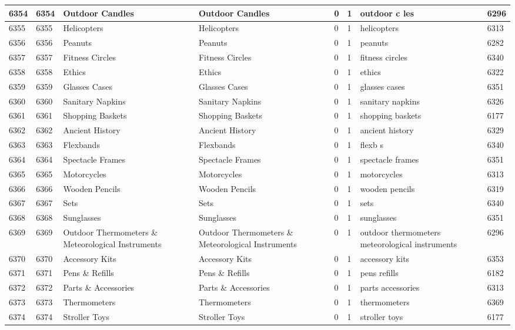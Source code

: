 \begin{longtable}{|l|l|l|l|l|l|l|l|}
6354 & 6354 & Outdoor Candles & Outdoor Candles & 0 & 1 & outdoor c les & 6296 \\ \hline 
6355 & 6355 & Helicopters & Helicopters & 0 & 1 & helicopters & 6313 \\ \hline 
6356 & 6356 & Peanuts & Peanuts & 0 & 1 & peanuts & 6282 \\ \hline 
6357 & 6357 & Fitness Circles & Fitness Circles & 0 & 1 & fitness circles & 6340 \\ \hline 
6358 & 6358 & Ethics & Ethics & 0 & 1 & ethics & 6322 \\ \hline 
6359 & 6359 & Glasses Cases & Glasses Cases & 0 & 1 & glasses cases & 6351 \\ \hline 
6360 & 6360 & Sanitary Napkins & Sanitary Napkins & 0 & 1 & sanitary napkins & 6326 \\ \hline 
6361 & 6361 & Shopping Baskets & Shopping Baskets & 0 & 1 & shopping baskets & 6177 \\ \hline 
6362 & 6362 & Ancient History & Ancient History & 0 & 1 & ancient history & 6329 \\ \hline 
6363 & 6363 & Flexbands & Flexbands & 0 & 1 & flexb s & 6340 \\ \hline 
6364 & 6364 & Spectacle Frames & Spectacle Frames & 0 & 1 & spectacle frames & 6351 \\ \hline 
6365 & 6365 & Motorcycles & Motorcycles & 0 & 1 & motorcycles & 6313 \\ \hline 
6366 & 6366 & Wooden Pencils & Wooden Pencils & 0 & 1 & wooden pencils & 6319 \\ \hline 
6367 & 6367 & Sets & Sets & 0 & 1 & sets & 6340 \\ \hline 
6368 & 6368 & Sunglasses & Sunglasses & 0 & 1 & sunglasses & 6351 \\ \hline 
6369 & 6369 & Outdoor Thermometers \& Meteorological Instruments & Outdoor Thermometers \& Meteorological Instruments & 0 & 1 & outdoor thermometers meteorological instruments & 6296 \\ \hline 
6370 & 6370 & Accessory Kits & Accessory Kits & 0 & 1 & accessory kits & 6353 \\ \hline 
6371 & 6371 & Pens \& Refills & Pens \& Refills & 0 & 1 & pens refills & 6182 \\ \hline 
6372 & 6372 & Parts \& Accessories & Parts \& Accessories & 0 & 1 & parts accessories & 6313 \\ \hline 
6373 & 6373 & Thermometers & Thermometers & 0 & 1 & thermometers & 6369 \\ \hline 
6374 & 6374 & Stroller Toys & Stroller Toys & 0 & 1 & stroller toys & 6177 \\ \hline 

\end{longtable}
